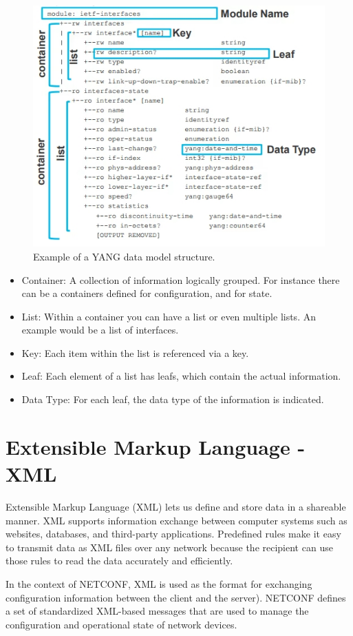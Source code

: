 \begin{figure}[h]
    \centering
    \includegraphics[width=0.7\linewidth]{Images/yang.jpg}
    \caption{Example of a YANG data model structure.}
    \label{fig:yangModels}
\end{figure}


\begin{itemize}
    \item Container: A collection of information logically grouped. For instance there can be a containers defined for configuration, and for state.
    \item List: Within a container you can have a list or even multiple lists. An example would be a list of interfaces.
    \item Key: Each item within the list is referenced via a key.
    \item Leaf: Each element of a list has leafs, which contain the actual information.
    \item Data Type: For each leaf, the data type of the information is indicated.
\end{itemize}

\section{Extensible Markup Language - XML}
Extensible Markup Language (XML) lets us define and store data in a shareable manner. XML supports information exchange between computer systems such as websites, databases, and third-party applications. Predefined rules make it easy to transmit data as XML files over any network because the recipient can use those rules to read the data accurately and efficiently.

In the context of NETCONF, XML is used as the format for exchanging configuration information between the client and the server). NETCONF defines a set of standardized XML-based messages that are used to manage the configuration and operational state of network devices.

